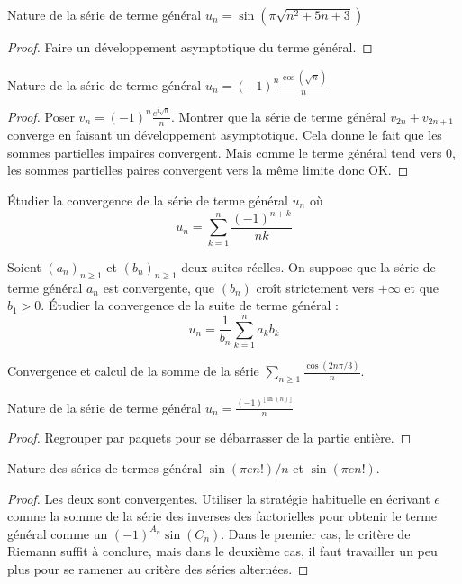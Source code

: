 \documentclass[french,a4paper]{article}
\theoremstyle{plain}
\theoremstyle{definition}
\theoremstyle{remark}
\begin{document}
\begin{ex}[Moulin.28]{}
	Nature de la série de terme général $u_n=\sin(\pi\sqrt{n^2+5n+3})$
\end{ex}
\begin{proof}
	Faire un développement asymptotique du terme général.
\end{proof}

\begin{ex}[Moulin.29]{}
	Nature de la série de terme général $u_n=\displaystyle(-1)^n\frac{\cos(\sqrt{n})}{n}$
\end{ex}
\begin{proof}
	Poser $\displaystyle v_n=(-1)^n\frac{e^{i\sqrt{n}}}{n}$. Montrer que la série de terme général $v_{2n}+v_{2n+1}$ converge en faisant un développement asymptotique. Cela donne le fait que les sommes partielles impaires convergent. Mais comme le terme général tend vers $0$, les sommes partielles paires convergent vers la même limite donc OK.
\end{proof}

\begin{ex}[Moulin.30]{}
	Étudier la convergence de la série de terme général $u_n$ où $$u_n=\sum_{k=1}^{n}\frac{(-1)^{n+k}}{nk}$$
\end{ex}

\begin{ex}[Moulin.31]{}
	Soient $(a_n)_{n\geqslant 1}$ et $(b_n)_{n\geqslant 1}$ deux suites réelles. On suppose que la série de terme général $a_n$ est convergente, que $(b_n)$ croît strictement vers $+\infty$ et que $b_1>0$. Étudier la convergence de la suite de terme général : $$u_n=\frac{1}{b_n}\sum_{k=1}^{n}a_kb_k$$
\end{ex}

\begin{ex}[Moulin.32]{}
	Convergence et calcul de la somme de la série $\displaystyle\sum_{n\geqslant 1}\frac{\cos(2n\pi/3)}{n}$.
\end{ex}

\begin{ex}[Moulin.33]{}
	Nature de la série de terme général $u_n=\displaystyle \frac{(-1)^{\lfloor\ln(n)\rfloor}}{n}$
\end{ex}
\begin{proof}
	Regrouper par paquets pour se débarrasser de la partie entière.
\end{proof}
\begin{ex}{}
	Nature des séries de termes général $\sin(\pi e n!)/n$ et $\sin(\pi en!)$.
\end{ex}
\begin{proof}
	Les deux sont convergentes. Utiliser la stratégie habituelle en écrivant $e$ comme la somme de la série des inverses des factorielles pour obtenir le terme général comme un $(-1)^{A_n}\sin(C_n)$. Dans le premier cas, le critère de Riemann suffit à conclure, mais dans le deuxième cas, il faut travailler un peu plus pour se ramener au critère des séries alternées.
\end{proof}
\end{document}
